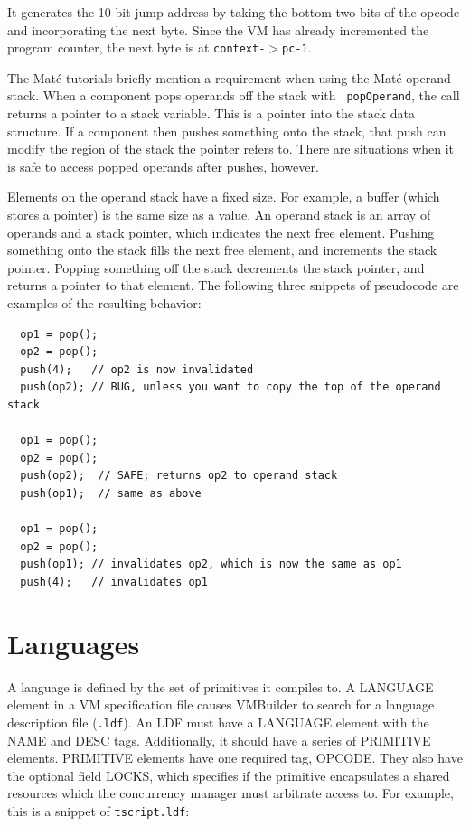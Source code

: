 \documentclass[12pt]{article}
\newcommand{\mate}{Mat\'{e}\xspace}
\begin{document}
It generates the 10-bit jump address by taking the bottom two bits of
the opcode and incorporating the next byte. Since the VM has already
incremented the program counter, the next byte is at {\tt context-$>$pc-1}.

The \mate tutorials briefly mention a requirement when using the \mate
operand stack. When a component pops operands off the stack with {\tt
popOperand}, the call returns a pointer to a stack variable. This is a
pointer into the stack data structure. If a component then pushes
something onto the stack, that push can modify the region of the stack
the pointer refers to. There are situations when it is safe to access
popped operands after pushes, however.

Elements on the operand stack have a fixed size. For example, a buffer
(which stores a pointer) is the same size as a value. An operand stack
is an array of operands and a stack pointer, which indicates the next
free element. Pushing something onto the stack fills the next free
element, and increments the stack pointer. Popping something off the
stack decrements the stack pointer, and returns a pointer to that
element. The following three snippets of pseudocode are examples of
the resulting behavior:

\begin{verbatim}
  op1 = pop();
  op2 = pop();
  push(4);   // op2 is now invalidated
  push(op2); // BUG, unless you want to copy the top of the operand stack

  op1 = pop();
  op2 = pop();
  push(op2);  // SAFE; returns op2 to operand stack
  push(op1);  // same as above

  op1 = pop();
  op2 = pop();
  push(op1); // invalidates op2, which is now the same as op1
  push(4);   // invalidates op1
\end{verbatim}


\section{Languages}
\label{sec:language}

A language is defined by the set of primitives it compiles to. A
LANGUAGE element in a VM specification file causes VMBuilder to search
for a language description file ({\tt .ldf}). An LDF must have a
LANGUAGE element with the NAME and DESC tags. Additionally, it should
have a series of PRIMITIVE elements.  PRIMITIVE elements have one
required tag, OPCODE. They also have the optional field LOCKS, which
specifies if the primitive encapsulates a shared resources which the
concurrency manager must arbitrate access to. For example, this is a
snippet of {\tt tscript.ldf}:
\end{document}
